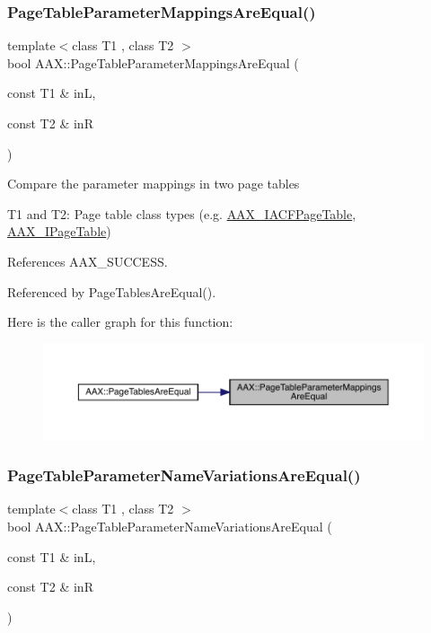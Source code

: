 \subsubsection{\texorpdfstring{PageTableParameterMappingsAreEqual()}{PageTableParameterMappingsAreEqual()}}
{\footnotesize\ttfamily template$<$class T1 , class T2 $>$ \\
bool A\+A\+X\+::\+Page\+Table\+Parameter\+Mappings\+Are\+Equal (\begin{DoxyParamCaption}\item[{const T1 \&}]{inL,  }\item[{const T2 \&}]{inR }\end{DoxyParamCaption})\hspace{0.3cm}{\ttfamily [inline]}}

Compare the parameter mappings in two page tables

{\ttfamily T1} and {\ttfamily T2\+:} Page table class types (e.\+g. \mbox{\hyperlink{a01725}{A\+A\+X\+\_\+\+I\+A\+C\+F\+Page\+Table}}, \mbox{\hyperlink{a01849}{A\+A\+X\+\_\+\+I\+Page\+Table}}) 

References A\+A\+X\+\_\+\+S\+U\+C\+C\+E\+SS.



Referenced by Page\+Tables\+Are\+Equal().

Here is the caller graph for this function\+:
\nopagebreak
\begin{figure}[H]
\begin{center}
\leavevmode
\includegraphics[width=350pt]{a00852_a6615318d686a57585ba69565f8e6a99b_icgraph}
\end{center}
\end{figure}
\mbox{\label{a00852_a2e75756c486e5db4ffa91579bb486a6a}} 
\subsubsection{\texorpdfstring{PageTableParameterNameVariationsAreEqual()}{PageTableParameterNameVariationsAreEqual()}}
{\footnotesize\ttfamily template$<$class T1 , class T2 $>$ \\
bool A\+A\+X\+::\+Page\+Table\+Parameter\+Name\+Variations\+Are\+Equal (\begin{DoxyParamCaption}\item[{const T1 \&}]{inL,  }\item[{const T2 \&}]{inR }\end{DoxyParamCaption})\hspace{0.3cm}{\ttfamily [inline]}}



